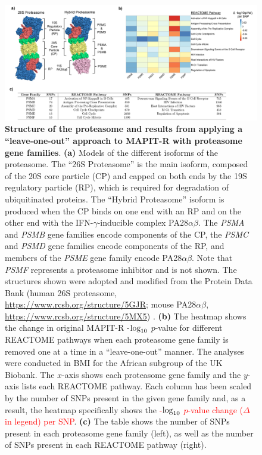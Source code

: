 \documentclass[10pt]{article}
\def\log{{\rm log}}
\begin{document}
\begin{landscape}
\begin{figure}[htbp]
\centering
\includegraphics[scale=.6]{Images/Main/InterPath_Main_Figure_Proteasome_vs2.png}
\caption{\textbf{Structure of the proteasome and results from applying a ``leave-one-out'' approach to MAPIT-R with proteasome gene families}. \textbf{(a)} Models of the different isoforms of the proteasome. The ``26S Proteasome'' is the main isoform, composed of the 20S core particle (CP) and capped on both ends by the 19S regulatory particle (RP), which is required for degradation of ubiquitinated proteins. The ``Hybrid Proteasome'' isoform is produced when the CP binds on one end with an RP and on the other end with the IFN-$\gamma$-inducible complex PA28$\alpha\beta$. The \textit{PSMA} and \textit{PSMB} gene families encode components of the CP, the \textit{PSMC} and \textit{PSMD} gene families encode components of the RP, and members of the \textit{PSME} gene family encode PA28$\alpha\beta$. Note that \textit{PSMF} represents a proteasome inhibitor and is not shown. The structures shown were adopted and modified from the Protein Data Bank (human 26S proteasome, \url{https://www.rcsb.org/structure/5GJR}; mouse PA28$\alpha\beta$, \url{https://www.rcsb.org/structure/5MX5}) \cite{Murata2018}. \textbf{(b)} The heatmap shows the change in original MAPIT-R -$\log_{10}$ $p$-value for different REACTOME pathways when each proteasome gene family is removed one at a time in a ``leave-one-out'' manner. The analyses were conducted in BMI for the African subgroup of the UK Biobank. The $x$-axis shows each proteasome gene family and the $y$-axis lists each REACTOME pathway. Each column has been scaled by the number of SNPs present in the given gene family and, as a result, the heatmap specifically shows the \textcolor{red}{-$\log_{10}$ $p$-value change ($\Delta$ in legend) per SNP}. \textbf{(c)} The table shows the number of SNPs present in each proteasome gene family (left), as well as the number of SNPs present in each REACTOME pathway (right).}
\label{InterPath-Main-Figure-Proteasome-Panels}
\end{figure} 
\end{landscape}


\begingroup
{}

\endgroup
\end{document}
